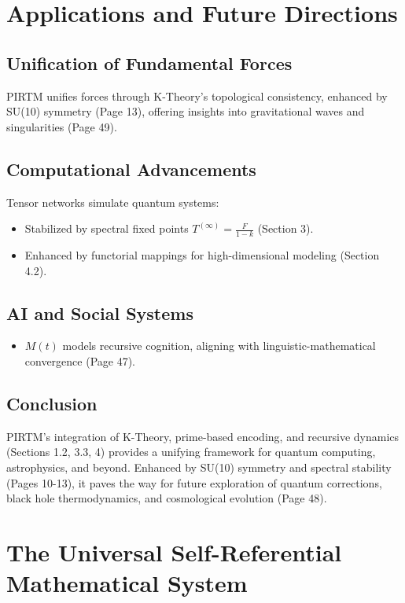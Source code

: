 \documentclass{article}
\theoremstyle{plain}
\begin{document}
\section{Applications and Future Directions}
\subsection{Unification of Fundamental Forces}
PIRTM unifies forces through K-Theory’s topological consistency, enhanced by SU(10) symmetry (Page 13), offering insights into gravitational waves and singularities (Page 49).

\subsection{Computational Advancements}
Tensor networks simulate quantum systems:
\begin{itemize}
    \item Stabilized by spectral fixed points \( T^{(\infty)} = \frac{F}{1 - k} \) (Section 3).
    \item Enhanced by functorial mappings for high-dimensional modeling (Section 4.2).
\end{itemize}

\subsection{AI and Social Systems}
\begin{itemize}
    \item \( M(t) \) models recursive cognition, aligning with linguistic-mathematical convergence (Page 47).
\end{itemize}

\subsection{Conclusion}
PIRTM’s integration of K-Theory, prime-based encoding, and recursive dynamics (Sections 1.2, 3.3, 4) provides a unifying framework for quantum computing, astrophysics, and beyond. Enhanced by SU(10) symmetry and spectral stability (Pages 10-13), it paves the way for future exploration of quantum corrections, black hole thermodynamics, and cosmological evolution (Page 48).

\section{The Universal Self-Referential Mathematical System}
\end{document}
